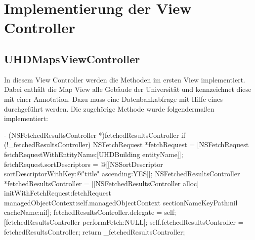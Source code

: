 \documentclass{report}
\begin{document}
\section{Implementierung der View Controller}

\subsection{UHDMapsViewController}\label{subsection_2}

In diesem View Controller werden die Methoden im ersten View implementiert. Dabei enthält die Map View alle Gebäude der Universität und kennzeichnet diese mit einer Annotation. Dazu muss eine Datenbankabfrage mit Hilfe eines  durchgeführt werden. Die zugehörige Methode wurde folgendermaßen implementiert:

\begin{objclst}
- (NSFetchedResultsController *)fetchedResultsController {
    if (!_fetchedResultsController) {
        NSFetchRequest *fetchRequest = [NSFetchRequest fetchRequestWithEntityName:[UHDBuilding entityName]];
        fetchRequest.sortDescriptors = @[[NSSortDescriptor sortDescriptorWithKey:@"title" ascending:YES]];
        NSFetchedResultsController *fetchedResultsController = [[NSFetchedResultsController alloc] initWithFetchRequest:fetchRequest managedObjectContext:self.managedObjectContext sectionNameKeyPath:nil cacheName:nil];
        fetchedResultsController.delegate = self;
        [fetchedResultsController performFetch:NULL];
        self.fetchedResultsController = fetchedResultsController;
    }
    return _fetchedResultsController;
}
\end{objclst}
\end{document}

